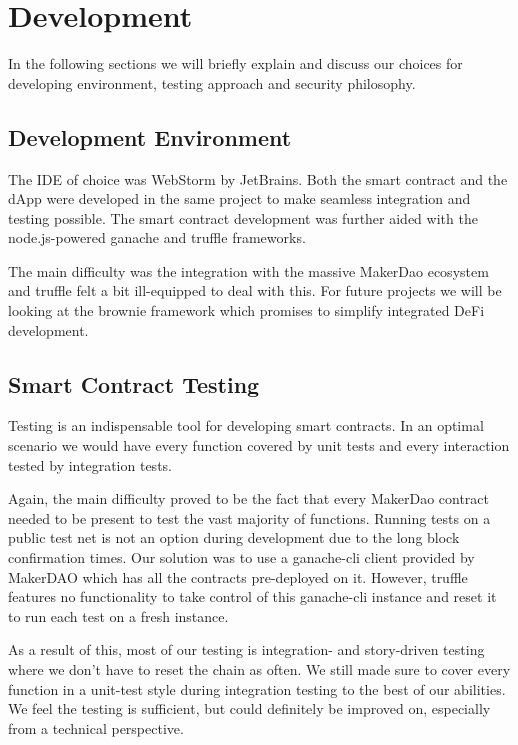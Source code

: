 \documentclass[12pt,a4paper,titlepage,oneside,english]{article}
\begin{document}

\section{Development}
In the following sections we will briefly explain and discuss our choices for developing environment, testing approach and security philosophy.

\subsection{Development Environment}

The IDE of choice was WebStorm by JetBrains. Both the smart contract and the dApp were developed in the same project to make seamless integration and testing possible. The smart contract development was further aided with the node.js-powered ganache and truffle frameworks.

The main difficulty was the integration with the massive MakerDao ecosystem and truffle felt a bit ill-equipped to deal with this. For future projects we will be looking at the brownie framework which promises to simplify integrated DeFi development.


\subsection{Smart Contract Testing}
Testing is an indispensable tool for developing smart contracts. In an optimal scenario we would have every function covered by unit tests and every interaction tested by integration tests. 

Again, the main difficulty proved to be the fact that every MakerDao contract needed to be present to test the vast majority of functions. Running tests on a public test net is not an option during development due to the long block confirmation times. Our solution was to use a ganache-cli client provided by MakerDAO which has all the contracts pre-deployed on it. However, truffle features no functionality to take control of this ganache-cli instance and reset it to run each test on a fresh instance.

As a result of this, most of our testing is integration- and story-driven testing where we don't have to reset the chain as often. We still made sure to cover every function in a unit-test style during integration testing to the best of our abilities. We feel the testing is sufficient, but could definitely be improved on, especially from a technical perspective.
\end{document}
